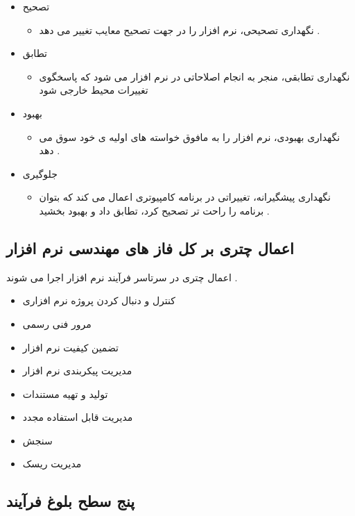\documentclass{article}
\begin{document}
\begin{itemize}
	\item تصحیح
	\begin{itemize}
		\item نگهداری تصحیحی، نرم افزار را در جهت تصحیح معایب تغییر می دهد .
	\end{itemize}
	\item تطابق
	\begin{itemize}
		\item نگهداری تطابقی، منجر به انجام اصلاحاتی در نرم افزار می شود که پاسخگوی تغییرات محیط خارجی شود
	\end{itemize}
	\item بهبود
	\begin{itemize}
		\item نگهداری بهبودی، نرم افزار را به مافوق خواسته های اولیه ی خود سوق می دهد .
	\end{itemize}
	\item جلوگیری
	\begin{itemize}
		\item نگهداری پیشگیرانه، تغییراتی در برنامه کامپیوتری اعمال می کند که بتوان برنامه را راحت تر تصحیح کرد، تطابق داد و بهبود بخشید .
	\end{itemize}
\end{itemize}



\subsection{اعمال چتری بر کل فاز های مهندسی نرم افزار}

اعمال چتری در سرتاسر فرآیند نرم افزار اجرا می شوند .

\begin{itemize}
	\item کنترل و دنبال کردن پروژه نرم افزاری
	\item مرور فنی رسمی
	\item تضمین کیفیت نرم افزار
	\item مدیریت پیکربندی نرم افزار
	\item تولید و تهیه مستندات
	\item مدیریت قابل استفاده مجدد
	\item سنجش
	\item مدیریت ریسک
\end{itemize}


\subsection{پنج سطح بلوغ فرآیند}
\end{document}
